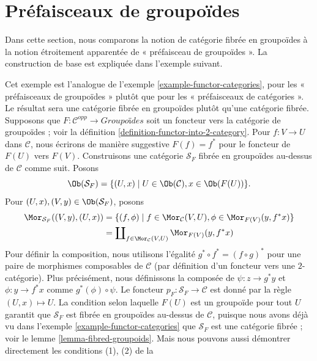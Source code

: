 \section{Préfaisceaux de groupoïdes}
\label{section-presheaves-groupoids}

\noindent
Dans cette section, nous comparons la notion de catégorie fibrée en groupoïdes
à la notion étroitement apparentée de « préfaisceau de groupoïdes ». La construction
de base est expliquée dans l'exemple suivant.

\begin{example}
\label{example-functor-groupoids}
Cet exemple est l'analogue de
l'exemple \ref{example-functor-categories},
pour les « préfaisceaux de groupoïdes » plutôt que pour les « préfaisceaux de catégories ».
Le résultat sera une catégorie fibrée en groupoïdes plutôt qu'une catégorie fibrée.
Supposons que $F : \mathcal{C}^{opp} \to \textit{Groupoïdes}$ soit un foncteur
vers la catégorie de groupoïdes ; voir la
définition \ref{definition-functor-into-2-category}.
Pour $f : V \to U$ dans $\mathcal{C}$, nous écrirons de manière suggestive
$F(f) = f^\ast$ pour le foncteur de $F(U)$ vers $F(V)$.
Construisons une catégorie $\mathcal{S}_F$ fibrée en groupoïdes au-dessus de $\mathcal{C}$
comme suit. Posons
$$
\Ob(\mathcal{S}_F) =
\{(U, x) \mid U\in \Ob(\mathcal{C}), x\in \Ob(F(U))\}.
$$
Pour $(U, x), (V, y) \in \Ob(\mathcal{S}_F)$, posons
\begin{align*}
\Mor_{\mathcal{S}_F}((V, y), (U, x))
& =
\{ (f, \phi) \mid f \in \Mor_\mathcal{C}(V, U),
\phi \in \Mor_{F(V)}(y, f^\ast x)\} \\
& =
\coprod\nolimits_{f \in \Mor_\mathcal{C}(V, U)}
\Mor_{F(V)}(y, f^\ast x)
\end{align*}
Pour définir la composition, nous utilisons l'égalité $g^\ast \circ f^\ast =
(f \circ g)^\ast$ pour une paire de morphismes composables de $\mathcal{C}$
(par définition d'un foncteur vers une $2$-catégorie).
Plus précisément, nous définissons la composée de $\psi : z \to g^\ast y$ et
$ \phi : y \to f^\ast x$ comme $ g^\ast(\phi) \circ \psi$. Le foncteur
$p_F : \mathcal{S}_F \to \mathcal{C}$ est donné par la règle $(U, x) \mapsto U$.
La condition selon laquelle $F(U)$ est un groupoïde pour tout $U$ garantit que
$\mathcal{S}_F$ est fibrée en groupoïdes au-dessus de $\mathcal{C}$, puisque nous avons
déjà vu dans
l'exemple \ref{example-functor-categories}
que $\mathcal{S}_F$ est une catégorie fibrée ; voir le
lemme \ref{lemma-fibred-groupoids}.
Mais nous pouvons aussi démontrer directement les conditions (1), (2) de la

\end{example}
